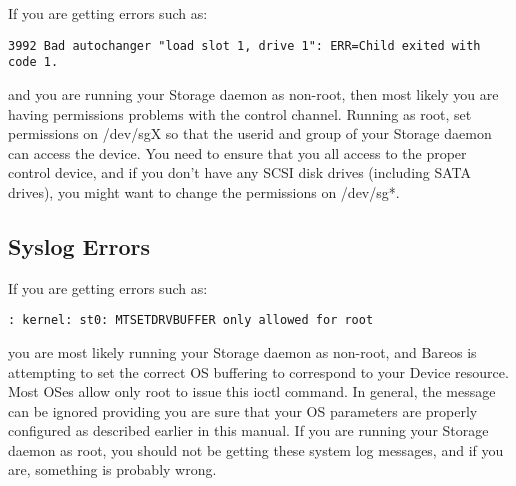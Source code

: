 {If you are getting errors such as:

\footnotesize
\begin{verbatim}
3992 Bad autochanger "load slot 1, drive 1": ERR=Child exited with code 1.
\end{verbatim}
\normalsize

and you are running your Storage daemon as non-root, then most likely
you are having permissions problems with the control channel. Running
as root, set permissions on /dev/sgX so that the userid and group of
your Storage daemon can access the device. You need to ensure that you
all access to the proper control device, and if you don't have any
SCSI disk drives (including SATA drives), you might want to change
the permissions on /dev/sg*.

\subsection{Syslog Errors}

If you are getting errors such as:

\footnotesize
\begin{verbatim}
: kernel: st0: MTSETDRVBUFFER only allowed for root
\end{verbatim}
\normalsize

you are most likely running your Storage daemon as non-root, and
Bareos is attempting to set the correct OS buffering to correspond
to your Device resource. Most OSes allow only root to issue this
ioctl command. In general, the message can be ignored providing
you are sure that your OS parameters are properly configured as
described earlier in this manual.  If you are running your Storage daemon
as root, you should not be getting these system log messages, and if
you are, something is probably wrong.
}